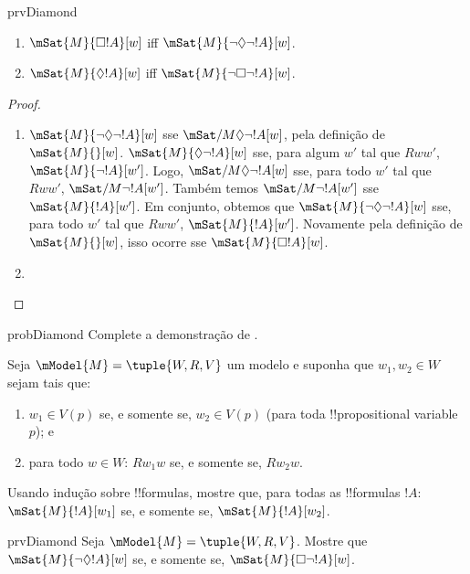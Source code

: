 \documentclass[../../../include/open-logic-section]{subfiles}
\begin{document}
\begin{tagblock}{prvDiamond}
\begin{prop}
  \begin{enumerate}
  \item $\mSat{M}{\Box !A}[w]$ iff $\mSat{M}{\lnot\Diamond\lnot !A}[w]$.
  \item $\mSat{M}{\Diamond !A}[w]$ iff $\mSat{M}{\lnot\Box\lnot !A}[w]$.
  \end{enumerate}
\end{prop}

\begin{proof}
  \begin{enumerate}
    \item $\mSat{M}{\lnot\Diamond\lnot !A}[w]$ sse $\mSat/{M}{\Diamond\lnot
      !A}[w]$, pela definição de $\mSat{M}{}[w]$. $\mSat{M}{\Diamond\lnot
      !A}[w]$ sse, para algum $w'$ tal que $Rww'$, $\mSat{M}{\lnot
      !A}[w']$. Logo, $\mSat/{M}{\Diamond\lnot !A}[w]$ sse, para todo
    $w'$ tal que $Rww'$, $\mSat/{M}{\lnot !A}[w']$. Também temos
    $\mSat/{M}{\lnot !A}[w']$ sse $\mSat{M}{!A}[w']$. Em conjunto,
    obtemos que $\mSat{M}{\lnot\Diamond\lnot !A}[w]$ sse, para todo $w'$
    tal que $Rww'$, $\mSat{M}{!A}[w']$. Novamente pela definição de
    $\mSat{M}{}[w]$, isso ocorre sse $\mSat{M}{\Box !A}[w]$.
    \item {}
  \end{enumerate}
\end{proof}

\begin{probtag}{probDiamond}
  Complete a demonstração de .
\end{probtag}
\end{tagblock}

\begin{prob}
  Seja $\mModel{M} = \tuple{W, R, V}$ um modelo e suponha que $w_1, w_2
  \in W$ sejam tais que:
  \begin{enumerate}
  \item $w_1 \in V(p)$ se, e somente se, $w_2 \in V(p)$ (para toda !!{propositional variable} $p$); e
  \item para todo $w \in W$: $Rw_1w$ se, e somente se, $Rw_2w$.
  \end{enumerate}
  Usando indução sobre !!{formula}s, mostre que, para todas as !!{formula}s $!A$:
  $\mSat{M}{!A}[w_1]$ se, e somente se, $\mSat{M}{!A}[w_2]$.
\end{prob}

\begin{probtag}{prvDiamond}
  Seja $\mModel{M} = \tuple{W, R, V}$. Mostre que
  $\mSat{M}{\lnot\Diamond !A}[w]$ se, e somente se,
  $\mSat{M}{\Box\lnot!A}[w]$.
\end{probtag}
\end{document}
